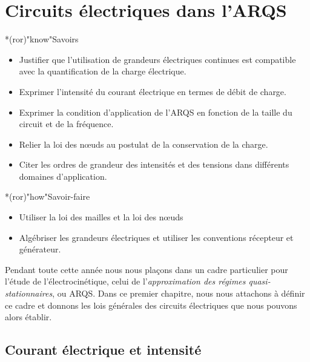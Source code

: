 \documentclass[../../main/main.tex]{subfiles}
\begin{document}
\setcounter{chapter}{0}

\chapter{Circuits \'electriques dans l'ARQS}

\vfill

\begin{prgm}
	\begin{tcb}*(ror)"know"{Savoirs}
		\begin{itemize}[label=$\diamond$, leftmargin=10pt]
			\item Justifier que l’utilisation de grandeurs électriques
			      continues est compatible avec la quantification de la charge
			      électrique.
			\item Exprimer l’intensité du courant électrique en termes de débit de
			      charge.
			\item Exprimer la condition d’application de l’ARQS en fonction de la
			      taille du circuit et de la fréquence.
			\item Relier la loi des nœuds au postulat de la conservation de la charge.
			\item Citer les ordres de grandeur des intensités et des tensions dans
			      différents domaines d’application.
		\end{itemize}
	\end{tcb}

	\begin{tcb}*(ror)"how"{Savoir-faire}
		\begin{itemize}[label=$\diamond$, leftmargin=10pt]
			\item Utiliser la loi des mailles et la loi des nœuds
			\item Algébriser les grandeurs électriques et utiliser les conventions
			      récepteur et générateur.
		\end{itemize}
	\end{tcb}
\end{prgm}

\vfill
\minitoc
\vfill

\newpage
Pendant toute cette année nous nous plaçons dans un cadre particulier pour
l'étude de l'électrocinétique, celui de l'\textit{approximation des régimes
	quasi-stationnaires}, ou ARQS. Dans ce premier chapitre, nous nous attachons à
définir ce cadre et donnons les lois générales des circuits électriques que nous
pouvons alors établir.

\section{Courant électrique et intensité}
\end{document}
